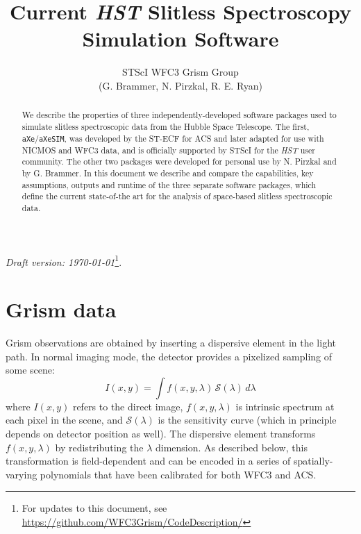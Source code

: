\documentclass[preprint]{aastex}
\begin{document}
\title{Current \textit{HST} Slitless Spectroscopy Simulation Software}

\author{STScI WFC3 Grism Group \\ (G. Brammer, N. Pirzkal, R. E. Ryan)}

\begin{abstract}
    We describe the properties of three independently-developed software packages used to simulate slitless spectroscopic data from the Hubble Space Telescope.  The first, \texttt{aXe}/\texttt{aXeSIM}, was developed by the ST-ECF for ACS and later adapted for use with NICMOS and WFC3 data,  and is officially supported by STScI for the \textit{HST} user community.  The other two packages were developed for personal use by N. Pirzkal and by G. Brammer.  In this document we describe and compare the capabilities, key assumptions, outputs and runtime of the three separate software packages, which define the current state-of-the art for the analysis of space-based slitless spectroscopic data.
    
\end{abstract}

\textit{Draft version: \today}\footnote{For updates to this document, see
\url{https://github.com/WFC3Grism/CodeDescription/}}.

\section{Grism data}


Grism observations are obtained by inserting a dispersive element in the light path.  In normal imaging mode, the detector provides a pixelized sampling of some scene:
\begin{dmath}
I(x,y) = \int f(x,y,\lambda)\,\mathcal{S}(\lambda)\,d\lambda
\end{dmath}
where $I(x,y)$ refers to the direct image, $f(x,y,\lambda)$ is intrinsic spectrum at each pixel in the scene, and $\mathcal{S}(\lambda)$ is the sensitivity curve (which in principle depends on detector position as well). The dispersive element transforms $f(x,y,\lambda)$ by redistributing the $\lambda$ dimension.  As described below, this transformation is field-dependent and can be encoded in a series of spatially-varying polynomials that have been calibrated for both WFC3 and ACS.
\end{document}

